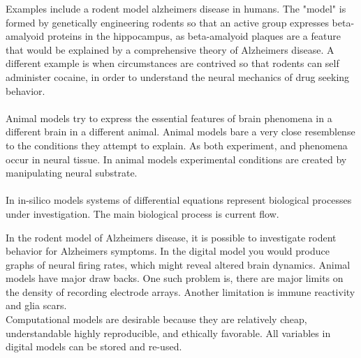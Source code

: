 Examples include a rodent model alzheimers disease in humans. The "model" is formed by 
genetically engineering rodents so that an active group expresses beta-amalyoid proteins in the hippocampus, as beta-amalyoid plaques are a feature that would be explained by a comprehensive theory of Alzheimers disease. A different example is when circumstances are contrived so that rodents can self administer cocaine, in order to understand the neural mechanics of drug seeking behavior.\\
\\
Animal models try to express the essential features of brain phenomena in a different brain in a different animal. Animal models bare a very close resemblense to the conditions they attempt to explain. As both experiment, and phenomena occur in neural tissue. In animal models experimental conditions are created by manipulating neural substrate.\\  
\\
In in-silico models systems of differential equations represent biological processes under investigation. The main biological process is current flow.


In the rodent model of Alzheimers disease, it is possible to investigate rodent behavior for Alzheimers symptoms. In the digital model you would produce graphs of neural firing rates, which might reveal altered brain dynamics. Animal models have major draw backs. One such problem is, there are major limits on the density of recording electrode arrays. Another limitation is immune reactivity and glia scars.\\

Computational models are desirable because they are relatively cheap, understandable highly reproducible, and ethically favorable. All variables in digital models can be stored and re-used.


